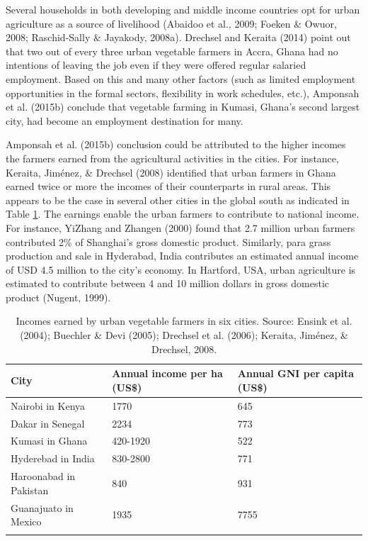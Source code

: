 Several households in both developing and middle income countries opt for urban agriculture as a source of livelihood (Abaidoo et al., 2009; Foeken \& Owuor, 2008; Raschid-Sally \& Jayakody, 2008a). Drechsel and Keraita (2014) point out that two out of every three urban vegetable farmers in Accra, Ghana had no intentions of leaving the job even if they were offered regular salaried employment. Based on this and many other factors (such as limited employment opportunities in the formal sectors, flexibility in work schedules, etc.), Amponsah et al. (2015b) conclude that vegetable farming in Kumasi, Ghana's second largest city, had become an employment destination for many.

Amponsah et al. (2015b) conclusion could be attributed to the higher incomes the farmers earned from the agricultural activities in the cities. For instance, Keraita, Jiménez, \& Drechsel (2008) identified that urban farmers in Ghana earned twice or more the incomes of their counterparts in rural areas. This appears to be the case in several other cities in the global south as indicated in Table \ref{tbl:incomesByUfarmens}. The earnings enable the urban farmers to contribute to national income. For instance, YiZhang and Zhangen (2000) found that 2.7 million urban farmers contributed 2\% of Shanghai's gross domestic product. Similarly, para grass production and sale in Hyderabad, India contributes an estimated annual income of USD 4.5 million to the city's economy. In Hartford, USA, urban agriculture is estimated to contribute between 4 and 10 million dollars in gross domestic product (Nugent, 1999).

\begin{table}[th]
\caption{Incomes earned by urban vegetable farmers in six cities. Source: Ensink et al. (2004); Buechler \& Devi (2005); Drechsel et al. (2006); Keraita, Jiménez, \& Drechsel, 2008.}
\begin{center}
\begin{tabular}{ p{} p{} p{} } 
\hline
City & Annual income per ha (US\$) & Annual GNI per capita (US\$) \\
\hline
Nairobi in Kenya & 1770 & 645 \\
Dakar in Senegal & 2234 & 773 \\
Kumasi in Ghana & 420-1920 & 522 \\
Hyderebad in India & 830-2800 & 771 \\
Haroonabad in Pakistan & 840 & 931 \\
Guanajuato in Mexico & 1935 & 7755 \\
\hline
\label{tbl:incomesByUfarmens}
\end{tabular}
\end{center}
\end{table}

